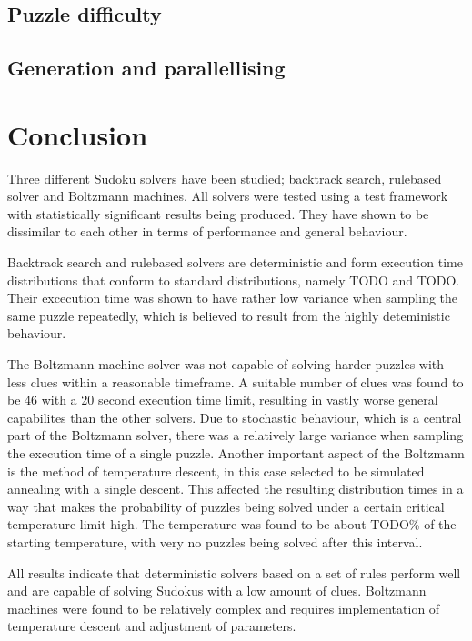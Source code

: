 \documentclass[a4paper,11pt]{kth-mag}
\begin{document}
\FloatBarrier
\section{Puzzle difficulty}

\section{Generation and parallellising}
\label{sec:generation}

\chapter{Conclusion}

Three different Sudoku solvers have been studied; backtrack search, rulebased solver and Boltzmann machines.
All solvers were tested using a test framework with statistically significant results being produced.
They have shown to be dissimilar to each other in terms of performance and general behaviour.

Backtrack search and rulebased solvers are deterministic and form execution time distributions that conform to standard distributions, namely TODO and TODO.
Their excecution time was shown to have rather low variance when sampling the same puzzle repeatedly, which is believed to result from the highly deteministic behaviour.

The Boltzmann machine solver was not capable of solving harder puzzles with less clues within a reasonable timeframe.
A suitable number of clues was found to be 46 with a 20 second execution time limit, resulting in vastly worse general capabilites than the other solvers.
Due to stochastic behaviour, which is a central part of the Boltzmann solver, there was a relatively large variance when sampling the execution time of a single puzzle.
Another important aspect of the Boltzmann is the method of temperature descent, in this case selected to be simulated annealing with a single descent.
This affected the resulting distribution times in a way that makes the probability of puzzles being solved under a certain critical temperature limit high.
The temperature was found to be about TODO\% of the starting temperature, with very no puzzles being solved after this interval.

All results indicate that deterministic solvers based on a set of rules perform well and are capable of solving Sudokus with a low amount of clues.
Boltzmann machines were found to be relatively complex and requires implementation of temperature descent and adjustment of parameters.
\end{document}

